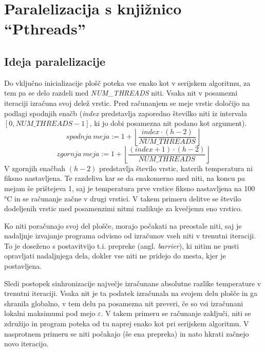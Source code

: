 \documentclass[a4paper,titlepage,11pt]{article}
\begin{document}
\pagebreak

\section{Paralelizacija s knjižnico ``Pthreads''}
\label{poglavje-pthreads}
\subsection{Ideja paralelizacije} \label{poglavje-ideja-paralelizacije-2}

Do vključno inicializacije plošč poteka vse enako kot v serijskem algoritmu, za tem pa se delo razdeli med \textit{NUM\_THREADS} niti. Vsaka nit v posamezni iteraciji izračuna svoj delež vrstic. Pred računanjem se meje vrstic določijo na podlagi spodnjih enačb (\textit{index} predstavlja zaporedno številko niti iz intervala $\left[0, NUM\_THREADS - 1\right]$, ki jo dobi posamezna nit podano kot argument).
\begin{equation}
spodnja \ meja := 1 + \left \lfloor{\frac{index \cdot (h - 2)}{NUM\_THREADS}}\right \rfloor
\end{equation}
\begin{equation}
zgornja \ meja := 1 + \left \lfloor{\frac{(index+1) \cdot (h - 2)}{NUM\_THREADS}}\right \rfloor
\end{equation}
V zgornjih enačbah $(h - 2)$ predstavlja število vrstic, katerih temperatura ni fiksno nastavljena. Te razdeliva kar se da enakomerno med niti, na koncu pa mejam še prištejeva 1, saj je temperatura prve vrstice fiksno nastavljena na 100 °C in se računanje začne v drugi vrstici. V takem primeru delitve se število dodeljenih vrstic med posamenzimi nitmi razlikuje za kvečjemu eno vrstico.

Ko niti poračunajo svoj del plošče, morajo počakati na preostale niti, saj je nadaljnje izvajanje programa odvisno od izračunov vseh niti v trenutni iteraciji. To je doseženo s postavitvijo t.i. prepreke (angl. \textit{barrier}), ki nitim ne pusti opravljati nadaljnjega dela, dokler vse niti ne pridejo do mesta, kjer je postavljena.

Sledi postopek sinhronizacije največje izračunane absolutne razlike temperature v trenutni iteraciji. Vsaka nit je ta podatek izračunala na svojem delu plošče in ga shranila globalno, v tem delu pa posamezna nit preveri, če so vsi izračunani lokalni maksimumi pod mejo \(\varepsilon\). V takem primeru se računanje zaključi, niti se združijo in program poteka od tu naprej enako kot pri serijskem algoritmu. V nasprotnem primeru se niti počakajo (še ena prepreka) in nato hkrati začnejo novo iteracijo.
\end{document}
